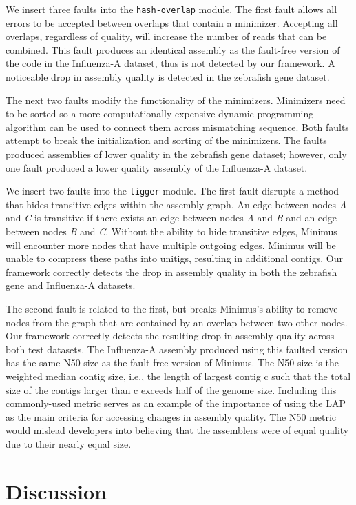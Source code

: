 \documentclass[12pt,\mydriver]{thesis}
\begin{document}
We insert three faults into the \texttt{hash-overlap} module.
The first fault allows all errors to be accepted between overlaps that contain a minimizer.
Accepting all overlaps, regardless of quality, will increase the number of reads that can be combined.
This fault produces an identical assembly as the fault-free version of the code in the Influenza-A dataset, thus is not detected by our framework.
A noticeable drop in assembly quality is detected in the zebrafish gene dataset.

The next two faults modify the functionality of the minimizers.
Minimizers need to be sorted so a more computationally expensive dynamic programming algorithm can be used to connect them across mismatching sequence.
Both faults attempt to break the initialization and sorting of the minimizers.
The faults produced assemblies of lower quality in the zebrafish gene dataset; however, only one fault produced a lower quality assembly of the Influenza-A dataset.

We insert two faults into the \texttt{tigger} module.
The first fault disrupts a method that hides transitive edges within the assembly graph.
An edge between nodes \emph{A} and \emph{C} is transitive if there exists an edge between nodes \emph{A} and \emph{B} and an edge between nodes \emph{B} and \emph{C}.
Without the ability to hide transitive edges, Minimus will encounter more nodes that have multiple outgoing edges.
Minimus will be unable to compress these paths into unitigs, resulting in additional contigs.
Our framework correctly detects the drop in assembly quality in both the zebrafish gene and Influenza-A datasets.

The second fault is related to the first, but breaks Minimus's ability to remove nodes from the graph that are contained by an overlap between two other nodes.
Our framework correctly detects the resulting drop in assembly quality across both test datasets.
The Influenza-A assembly produced using this faulted version has the same N50 size as the fault-free version of Minimus.
The N50 size is the weighted median
contig size, i.e., the length of largest contig c such that
the total size of the contigs larger than c exceeds half of
the genome size.
Including this commonly-used metric serves as an example of the importance of using the LAP as the main criteria for accessing changes in assembly quality.
The N50 metric would mislead developers into believing that the assemblers were of equal quality due to their nearly equal size.


\section{Discussion}
\label{discussion}
\end{document}
